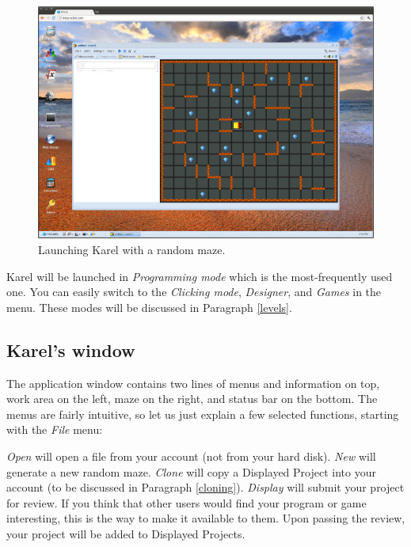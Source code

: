 \begin{figure}[!ht]
\begin{center}
\includegraphics[width=\textwidth]{imgk/init.png}
\end{center}
\vspace{-2mm}
\caption{Launching Karel with a random maze.}
\label{fig:init}
\end{figure}
\noindent
Karel will be launched in {\em Programming mode} which is the most-frequently 
used one. You can easily switch to the {\em Clicking mode}, {\em Designer},
and {\em Games} in the menu. These modes will be discussed in Paragraph 
\ref{levels}.

\subsection{Karel's window} \label{menu}

The application window contains two lines of menus and information on top,
work area on the left, maze on the right, and status bar on the bottom.
The menus are fairly intuitive, so let us just explain a few selected 
functions, starting with the {\em File} menu:

{\em Open} will open a file from your account (not from your hard disk). {\em New} will generate a new random maze.
{\em Clone} will copy a Displayed Project into your account (to be discussed in Paragraph \ref{cloning}). 
{\em Display} will submit your project for review. If you think that 
      other users would find your program or game interesting, this is the way to make it 
      available to them. Upon passing the review, your project will be added to Displayed Projects.

